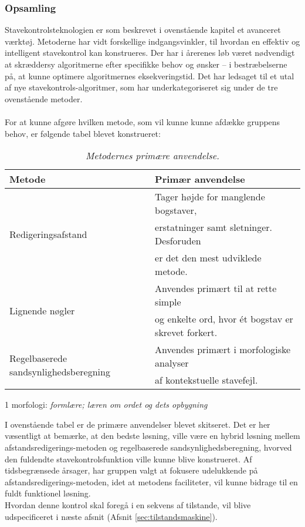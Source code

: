 \subsubsection{Opsamling}
Stavekontrolsteknologien er som beskrevet i ovenstående kapitel et avanceret værktøj. Metoderne har vidt forskellige indgangsvinkler, til hvordan en effektiv og intelligent stavekontrol kan konstrueres. Der har i årerenes løb været nødvendigt at skræddersy algoritmerne efter specifikke behov og ønsker – i bestræbelserne på, at kunne optimere algoritmernes eksekveringstid. Det har ledsaget til et utal af nye stavekontrols-algoritmer, som har underkategoriseret sig under de tre ovenstående metoder. \\\\
For at kunne afgøre hvilken metode, som vil kunne kunne afdække gruppens behov, er følgende tabel blevet konstrueret: \\ 
\begin{table}[h]
    \begin{threeparttable}
        \begin{tabular}{l|l}
        \centering
            Metode & Primær anvendelse \\ \hline \hline
            \multirow{3}{*}{Redigeringsafstand} & Tager højde for manglende bogstaver, \\ 
            & erstatninger samt sletninger. Desforuden \\ 
            & er det den mest udviklede metode. \\ \hline
            \multirow{2}{*}{Lignende nøgler} & Anvendes primært til at rette simple \\ 
            & og enkelte ord, hvor ét bogstav er skrevet forkert. \\ \hline 
            \multirow{2}{*}{Regelbaserede sandsynlighedsberegning} & Anvendes primært i morfologiske analyser\tnote{1} \\
            & af kontekstuelle stavefejl. \\ \hline 
        \end{tabular}
        \begin{tablenotes}
            \item[1] morfologi: \textit{formlære; læren om ordet og dets opbygning}\cite{DDOmorfologi}
        \end{tablenotes}
    \end{threeparttable}
    \caption{\textit{Metodernes primære anvendelse. \tabelgroup}}
\end{table} 

I ovenstående tabel er de primære anvendelser blevet skitseret. Det er her væsentligt at bemærke, at den bedste løsning, ville være en hybrid løsning mellem afstandsredigerings-metoden og regelbaserede sandsynlighedsberegning, hvorved den fuldendte stavekontrolsfunktion ville kunne blive konstrueret. Af tidsbegrænsede årsager, har gruppen valgt at fokusere udelukkende på afstandsredigerings-metoden, idet at metodens faciliteter, vil kunne bidrage til en fuldt funktionel løsning. \\

Hvordan denne kontrol skal foregå i en sekvens af tilstande, vil blive udspecificeret i næste afsnit (Afsnit \ref{sec:tilstandsmaskine}).
